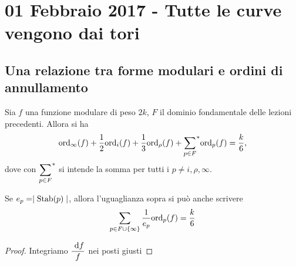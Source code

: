 \chapter{01 Febbraio 2017 - Tutte le curve vengono dai tori}

\section{Una relazione tra forme modulari e ordini di annullamento}

\begin{teorema}
    Sia $f$ una funzione modulare di peso $2k$, $F$ il dominio fondamentale delle lezioni precedenti. Allora si ha
    \begin{equation*}
	\text{ord}_\infty(f)+\frac{1}{2}\text{ord}_i(f)+\frac{1}{3}\text{ord}_{\rho}(f)+{\sum_{p\in F}}^{*}\text{ord}_p(f)=\frac{k}{6},
    \end{equation*}
    dove con $\displaystyle {\sum_{p\in F}}^{*}$ si intende la somma per tutti i $p \neq i, \rho, \infty$.
    
    Se $e_p=\mid \text{Stab}(p) \mid$, allora l'uguaglianza sopra si può anche scrivere
    \begin{equation*}
     	\sum_{p\in F \cup \{\infty\}} \frac{1}{e_p}\text{ord}_p(f)=\frac{k}{6}
    \end{equation*}
\end{teorema}
\begin{proof}
    Integriamo $\displaystyle \frac{\text{ d} f}{f}$ nei posti giusti
\end{proof}
